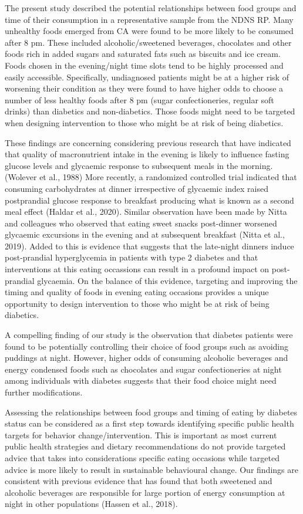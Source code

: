 \documentclass[utf8]{frontiersSCNS}
\begin{document}
The present study described the potential relationships between food
groups and time of their consumption in a representative sample from the
NDNS RP. Many unhealthy foods emerged from CA were found to be more
likely to be consumed after 8 pm. These included alcoholic/sweetened
beverages, chocolates and other foods rich in added sugars and saturated
fats such as biscuits and ice cream. Foods chosen in the evening/night
time slots tend to be highly processed and easily accessible.
Specifically, undiagnosed patients might be at a higher risk of
worsening their condition as they were found to have higher odds to
choose a number of less healthy foods after 8 pm (sugar confectioneries,
regular soft drinks) than diabetics and non-diabetics. Those foods might
need to be targeted when designing intervention to those who might be at
risk of being diabetics.

These findings are concerning considering previous research that have
indicated that quality of macronutrient intake in the evening is likely
to influence fasting glucose levels and glycaemic response to subsequent
meals in the morning. (Wolever et al., 1988) More recently, a randomized
controlled trial indicated that consuming carbohydrates at dinner
irrespective of glycaemic index raised postprandial glucose response to
breakfast producing what is known as a second meal effect (Haldar et
al., 2020). Similar observation have been made by Nitta and colleagues
who observed that eating sweet snacks post-dinner worsened glycaemic
excursions in the evening and at subsequent breakfast (Nitta et al.,
2019). Added to this is evidence that suggests that the late-night
dinners induce post-prandial hyperglycemia in patients with type 2
diabetes and that interventions at this eating occassions can result in
a profound impact on post-prandial glycaemia. On the balance of this
evidence, targeting and improving the timing and quality of foods in
evening eating occasions provides a unique opportunity to design
intervention to those who might be at risk of being diabetics.

A compelling finding of our study is the observation that diabetes
patients were found to be potentially controlling their choice of food
groups such as avoiding puddings at night. However, higher odds of
consuming alcoholic beverages and energy condensed foods such as
chocolates and sugar confectioneries at night among individuals with
diabetes suggests that their food choice might need further
modifications.

Assessing the relationships between food groups and timing of eating by
diabetes status can be considered as a first step towards identifying
specific public health targets for behavior change/intervention. This is
important as most current public health strategies and dietary
recommendations do not provide targeted advice that takes into
considerations specific eating occasions while targeted advice is more
likely to result in sustainable behavioural change. Our findings are
consistent with previous evidence that has found that both sweetened and
alcoholic beverages are responsible for large portion of energy
consumption at night in other populations (Hassen et al., 2018).
\end{document}
